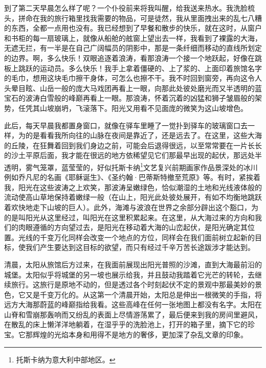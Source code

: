 \par 到了第二天早晨怎么样了呢？一个仆役前来将我叫醒，给我送来热水。我洗脸梳头，拼命在我的旅行箱里找我需要的物品，可是徒然，我从里面拽出来的乱七八糟的东西，全都一点用也没有。我已经想到了早餐和散步的快乐，就在这时，从窗户和书柜的每一扇玻璃上，就像从船舱的舷窗上望出去一样，我看到了裸露的大海，无遮无拦，有一半是在自己广阔幅员的阴影中，那是一条纤细而移动的直线所划定的边界。啊，多么快乐！双眼追逐着浪涛，看那浪涛一个接一个地跃起，好像在跳板上跳跃的运动员。多么快乐！我手上拿着僵硬的、上了浆的、上面印着旅馆名字的毛巾，想用这块毛巾擦干身体，可怎么也擦不干。我不时回到窗旁，再向这令人头晕目眩、山岳一般的庞大马戏团再看上一眼，向那此处彼处磨光而又半透明的蓝宝石的波涛白雪般的峰巅再看上一眼。那浪涛，怀着沉着的凶猛和狮子皱眉般的架势，任凭其山坡崩坍，飞滚落下。阳光又用看不见面庞的微笑为这山坡增色。
\par 此后，每天早晨我都置身窗口，就像在驿车里睡了一觉扑到驿车的玻璃窗口去一样，为的是看看我所向往的山脉在夜间是靠近了，还是远去了。在这里，这些大海的丘陵，在狂舞着回到我们身边之前，可能会后退得很远，以至常常要在一片长长的沙土平原后面，我才能在很远的地方依稀望见它们那最早出现的起伏，那远处半透明，雾气笼罩，蓝莹莹的，好似托斯卡纳\footnote{托斯卡纳为意大利中部地区。}文艺复兴前期画家作品景深处的冰川例如乔凡尼的名画《耶稣诞生》、《圣约翰·巴蒂斯特撤至荒原》等。有时，紧挨着我，阳光在这些波涛之上欢笑，那波涛呈嫩绿色，恰似潮湿的土地和光线液体般的流动使高山草地保持着嫩绿一般（在山上，阳光此处彼处展开，有如不均衡地跳跃着欢快地走下山坡的巨人）。此外，海滩与波浪在世界之余部分辟出这个豁口，为的是叫阳光从这里经过，叫阳光在这里积累起来。在这里，从大海过来的方向和我们的肉眼遵循的方向望过去，是阳光在移动着大海的山峦起伏，是阳光确定其位置。光线的千变万化同样会改变一个地点的方位，同样会在我们面前树立起新的目标，使我们产生要达到这目标的欲望，而只有经过千辛万苦长途跋涉才能达到。
\par 清晨，太阳从旅馆后方过来，在我面前展现出阳光普照的沙滩，直到大海最前沿的城堡。太阳似乎将城堡的另一坡也展示给我，并且鼓动我踏着它光芒的转轮，去继续旅行。这旅行是原地不动的，但是透过各个时刻起伏不定的景观中那最美妙的景色，它又是千变万化的。从这第一个清晨开始，太阳总是伸出一根微笑的手指，将远方大海那蔚蓝的峰巅指给我看。这些高峰在任何一张地图上都没有名字。太阳在山脊和雪崩那轰响而又纷乱的表面上尽情游荡累了，最后便来到我的房间里避风，在散乱的床上懒洋洋地躺着，在湿乎乎的洗脸池上，打开的箱子里，摘下它的珍宝。它那辉煌的光焰本身和用得不是地方的奢侈，更加深了杂乱文章的印象。
